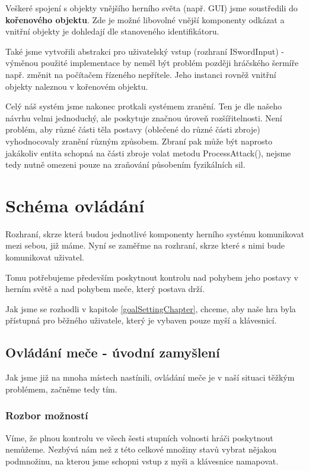 Veškeré spojení s objekty vnějšího herního světa (např. GUI) jsme soustředili do \textbf{kořenového objektu}. Zde je možné libovolné vnější komponenty odkázat a vnitřní objekty je dohledají dle stanoveného identifikátoru.

Také jsme vytvořili abstrakci pro uživatelský vstup (rozhraní ISwordInput) - výměnou použité implementace by neměl být problém později hráčského šermíře např. změnit na počítačem řízeného nepřítele. Jeho instanci rovněž vnitřní objekty naleznou v kořenovém objektu. 

Celý náš systém jsme nakonec protkali systémem zranění. Ten je dle našeho návrhu velmi jednoduchý, ale poskytuje značnou úroveň rozšířitelnosti. Není problém, aby různé části těla postavy (oblečené do různé části zbroje) vyhodnocovaly zranění různým způsobem. Zbraní pak může být naprosto jakákoliv entita schopná na části zbroje volat metodu ProcessAttack(), nejsme tedy nutně omezeni pouze na zraňování působením fyzikálních sil.


\section{Schéma ovládání} 

Rozhraní, skrze která budou jednotlivé komponenty herního systému komunikovat mezi sebou, již máme. Nyní se zaměřme na rozhraní, skrze které s nimi bude komunikovat uživatel.

Tomu potřebujeme především poskytnout kontrolu nad pohybem jeho postavy v herním světě a nad pohybem meče, který postava drží.

Jak jsme se rozhodli v kapitole \ref{goalSettingChapter}, chceme, aby naše hra byla přístupná pro běžného uživatele, který je vybaven pouze myší a klávesnicí.

\subsection{Ovládání meče - úvodní zamyšlení}

Jak jsme již na mnoha místech nastínili, ovládání meče je v naší situaci těžkým problémem, začněme tedy tím. 

\subsubsection*{Rozbor možností}

Víme, že plnou kontrolu ve všech šesti stupních volnosti hráči poskytnout nemůžeme. Nezbývá nám než z této celkové množiny stavů vybrat nějakou podmnožinu, na kterou jsme schopni vstup z myši a klávesnice namapovat.

